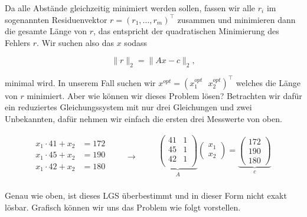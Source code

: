 Da alle Abstände gleichzeitig minimiert werden sollen, fassen wir alle \( r_i \) im sogenannten Residuenvektor \( r = (r_1, \dots, r_m)^\top \) zusammen und minimieren dann die gesamte Länge von \( r \), das entspricht der quadratischen Minimierung des Fehlers \( r \). Wir suchen also das \( x \) sodass

\begin{equation*}
    \lVert r \rVert_2 = \lVert A x - c \rVert_2,
\end{equation*}

minimal wird. In unserem Fall suchen wir \( x^{opt} = (x_1^{opt} \ \ \ x_2^{opt})^\top\) welches die Länge von \( r \) minimiert. Aber wie können wir dieses Problem lösen? Betrachten wir dafür ein reduziertes Gleichungssystem mit nur drei Gleichungen und zwei Unbekannten, dafür nehmen wir einfach die ersten drei Messwerte von oben. 

\begin{equation*}
    \begin{aligned}
        x_1\cdot 41 + x_2&= 172 \\
        x_1\cdot 45 + x_2&= 190 \\
        x_1\cdot 42 + x_2&= 180 \\
    \end{aligned} \qquad \rightarrow \qquad
    \begin{aligned}
        \underbrace{
        \begin{pmatrix}
            41 & 1 \\
            45 & 1 \\
            42 & 1 \\
        \end{pmatrix}}_{A}
        \begin{pmatrix}
            x_1\\ x_2
        \end{pmatrix}
        =
        \underbrace{
        \begin{pmatrix}
            172 \\ 190 \\ 180
        \end{pmatrix}}_{c} \\
    \end{aligned}
\end{equation*}

Genau wie oben, ist dieses LGS überbestimmt und in dieser Form nicht exakt lösbar. Grafisch können wir uns das Problem wie folgt vorstellen. 

\newpage

